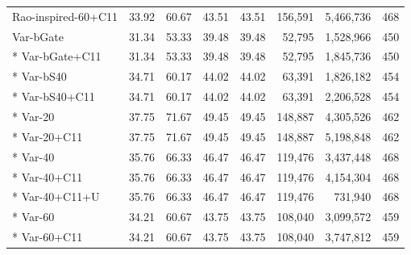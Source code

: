 \begin{small}
\begin{longtable}{lrrrrrrr}
Rao-inspired-60+C11 & 33.92 & 60.67 & 43.51 & 43.51 & 156,591 & 5,466,736 & 468 \\
Var-bGate & 31.34 & 53.33 & 39.48 & 39.48 & 52,795 & 1,528,966 & 450 \\*
Var-bGate+C11 & 31.34 & 53.33 & 39.48 & 39.48 & 52,795 & 1,845,736 & 450 \\*
Var-bS40 & 34.71 & 60.17 & 44.02 & 44.02 & 63,391 & 1,826,182 & 454 \\*
Var-bS40+C11 & 34.71 & 60.17 & 44.02 & 44.02 & 63,391 & 2,206,528 & 454 \\*
Var-20 & 37.75 & 71.67 & 49.45 & 49.45 & 148,887 & 4,305,526 & 462 \\*
Var-20+C11 & 37.75 & 71.67 & 49.45 & 49.45 & 148,887 & 5,198,848 & 462 \\*
Var-40 & 35.76 & 66.33 & 46.47 & 46.47 & 119,476 & 3,437,448 & 468 \\*
Var-40+C11 & 35.76 & 66.33 & 46.47 & 46.47 & 119,476 & 4,154,304 & 468 \\*
Var-40+C11+U & 35.76 & 66.33 & 46.47 & 46.47 & 119,476 & 731,940 & 468 \\*
Var-60 & 34.21 & 60.67 & 43.75 & 43.75 & 108,040 & 3,099,572 & 459 \\*
Var-60+C11 & 34.21 & 60.67 & 43.75 & 43.75 & 108,040 & 3,747,812 & 459 \\
\bottomrule\end{longtable}\end{small}

